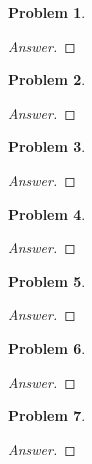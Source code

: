 \documentclass{article}
\newtheorem{problem}{Problem}[section]
\begin{document}
\begin{problem}
    
\end{problem}

\begin{proof}[Answer]
    
\end{proof}

\begin{problem}
    
\end{problem}

\begin{proof}[Answer]
    
\end{proof}

\begin{problem}
    
\end{problem}

\begin{proof}[Answer]
    
\end{proof}

\begin{problem}
    
\end{problem}

\begin{proof}[Answer]
    
\end{proof}

\begin{problem}
    
\end{problem}

\begin{proof}[Answer]
    
\end{proof}


\begin{problem}
    
\end{problem}

\begin{proof}[Answer]
    
\end{proof}


\begin{problem}
    
\end{problem}

\begin{proof}[Answer]
    
\end{proof}
\end{document}
